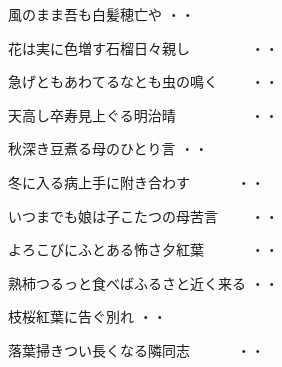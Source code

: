 \vspace{0.6cm}
\begin{shiika}風のまま吾も白髪穂亡や
\hfill{・・}\end{shiika}
\vspace{0.6cm}
\begin{shiika}花は実に色増す石榴日々親し　　　　
\hfill{・・}\end{shiika}
\vspace{0.6cm}
\begin{shiika}急げともあわてるなとも虫の鳴く　　
\hfill{・・}\end{shiika}
\vspace{0.6cm}
\begin{shiika}天高し卒寿見上ぐる明治晴　　　　　
\hfill{・・}\end{shiika}
\vspace{0.6cm}
\begin{shiika}秋深き豆煮る母のひとり言
\hfill{・・}\end{shiika}
\vspace{0.6cm}
\begin{shiika}冬に入る病上手に附き合わす　　　
\hfill{・・}\end{shiika}
\vspace{0.6cm}
\begin{shiika}いつまでも娘は子こたつの母苦言　　
\hfill{・・}\end{shiika}
\vspace{0.6cm}
\begin{shiika}よろこびにふとある怖さ夕紅葉　　　
\hfill{・・}\end{shiika}
\vspace{0.6cm}
\begin{shiika}熟柿つるっと食べばふるさと近く来る
\hfill{・・}\end{shiika}
\vspace{0.6cm}
\begin{shiika}枝桜紅葉に告ぐ別れ
\hfill{・・}\end{shiika}
\vspace{0.6cm}
\begin{shiika}落葉掃きつい長くなる隣同志　　　
\hfill{・・}\end{shiika}
